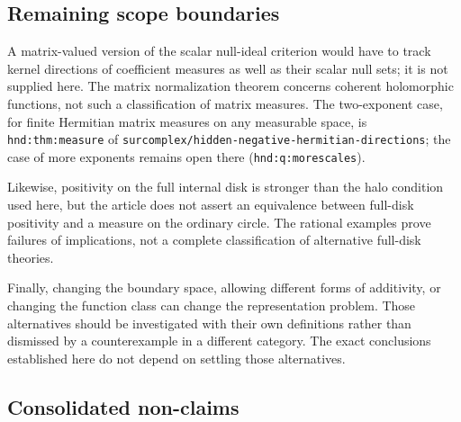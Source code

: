 \documentclass[11pt,letterpaper]{article}
\theoremstyle{definition}
\newcommand{\repo}[1]{\nolinkurl{#1}}%
\numberwithin{equation}{section}
\begin{document}
\subsection{Remaining scope boundaries}

A matrix-valued version of the scalar null-ideal criterion would have to track kernel directions of coefficient measures as well as their scalar null sets; it is not supplied here. The matrix normalization theorem concerns coherent holomorphic functions, not such a classification of matrix measures.
The two-exponent case, for finite Hermitian matrix measures on any measurable space, is \texttt{hnd:thm:measure} of \repo{surcomplex/hidden-negative-hermitian-directions}; the case of more exponents remains open there (\texttt{hnd:q:morescales}).

Likewise, positivity on the full internal disk is stronger than the halo condition used here, but the article does not assert an equivalence between full-disk positivity and a measure on the ordinary circle. The rational examples prove failures of implications, not a complete classification of alternative full-disk theories.

Finally, changing the boundary space, allowing different forms of additivity, or changing the function class can change the representation problem. Those alternatives should be investigated with their own definitions rather than dismissed by a counterexample in a different category. The exact conclusions established here do not depend on settling those alternatives.

\subsection{Consolidated non-claims}
\label{herg:sec:nonclaims}
\end{document}
